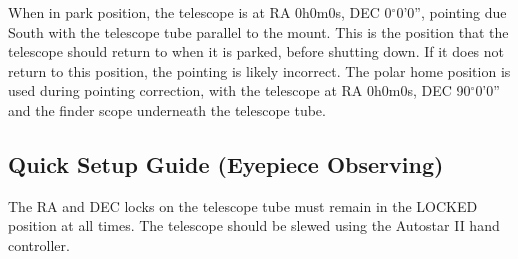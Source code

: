 \documentclass[12pt,titlepage]{article}
\renewcommand\deg{\mbox{$^\circ$}}
\begin{document}
\noindent When in park position, the telescope is at RA 0h0m0s, DEC 0$\deg$0'0'', pointing due South with the telescope tube parallel to the mount.
This is the position that the telescope should return to when it is parked, before shutting down.
If it does not return to this position, the pointing is likely incorrect.
The polar home position is used during pointing correction, with the telescope at RA 0h0m0s, DEC 90$\deg$0'0'' and the finder scope underneath the telescope tube.

\subsection{Quick Setup Guide (Eyepiece Observing)} \label{ssec:betsy_quick}
The RA and DEC locks on the telescope tube must remain in the LOCKED position at all times. The telescope should be slewed using the Autostar II hand controller.
\end{document}
